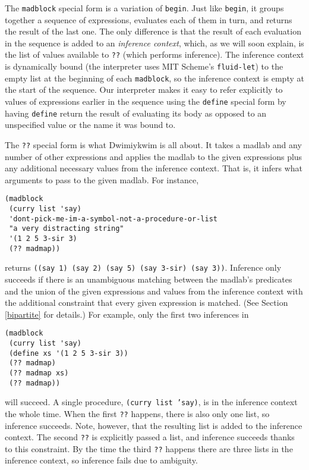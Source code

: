 \documentclass[11pt]{article}
\begin{document}
The \texttt{madblock} special form is a variation of \texttt{begin}.
Just like \texttt{begin},
it groups together a sequence of expressions,
evaluates each of them in turn,
and returns the result of the last one.
The only difference is that the result of each evaluation in the sequence
is added to an \emph{inference context},
which, as we will soon explain,
is the list of values available to \texttt{??}
(which performs inference).
The inference context is dynamically bound
(the interpreter uses MIT Scheme's \texttt{fluid-let})
to the empty list at the beginning of each \texttt{madblock},
so the inference context is empty at the start of the sequence.
Our interpreter makes it easy to refer explicitly
to values of expressions earlier in the sequence
using the \texttt{define} special form
by having \texttt{define} return the result of evaluating its body
as opposed to an unspecified value or the name it was bound to.

The \texttt{??} special form is what Dwimiykwim is all about.
It takes a madlab and any number of other expressions
and applies the madlab to the given expressions
plus any additional necessary values from the inference context.
That is, it infers what arguments to pass to the given madlab.
For instance,
\begin{Verbatim}
(madblock
 (curry list 'say)
 'dont-pick-me-im-a-symbol-not-a-procedure-or-list
 "a very distracting string"
 '(1 2 5 3-sir 3)
 (?? madmap))
\end{Verbatim}
returns \texttt{((say 1) (say 2) (say 5) (say 3-sir) (say 3))}.
Inference only succeeds if there is an unambiguous matching
between the madlab's predicates and the union of the given expressions
and values from the inference context
with the additional constraint that every given expression is matched.
(See Section \ref{bipartite} for details.)
For example, only the first two inferences in
\begin{Verbatim}
(madblock
 (curry list 'say)
 (define xs '(1 2 5 3-sir 3))
 (?? madmap)
 (?? madmap xs)
 (?? madmap))
\end{Verbatim}
will succeed.
A single procedure, \texttt{(curry list 'say)},
is in the inference context the whole time.
When the first \texttt{??} happens,
there is also only one list, so inference succeeds.
Note, however, that the resulting list is added to the inference context.
The second \texttt{??} is explicitly passed a list,
and inference succeeds thanks to this constraint.
By the time the third \texttt{??} happens
there are three lists in the inference context,
so inference fails due to ambiguity.
\end{document}
